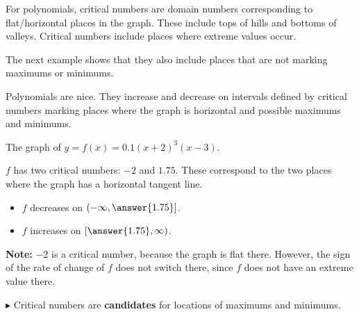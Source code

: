 \documentclass{ximera}
\begin{document}
For polynomials, critical numbers are domain numbers corresponding to flat/horizontal places in the graph.  These include tops of hills and bottoms of valleys. Critical numbers include places where extreme values occur.


The next example shows that they also include places that are not marking maximums or minimums.


















Polynomials are nice.  They increase and decrease on intervals defined by critical numbers marking places where the graph is horizontal and possible maximums and minimums.









\begin{example}

The graph of $y = f(x) = 0.1(x+2)^3(x-3)$.



\begin{center}
\end{center}



$f$ has two critical numbers: $-2$ and $1.75$. These correspond to the two places where the graph has a horizontal tangent line.

\begin{itemize}
\item $f$ decreases on $\left(-\infty, \answer{1.75}\right]$.
\item $f$ increases on $\left[\answer{1.75}, \infty\right)$.
\end{itemize}




\end{example}


\textbf{Note:} $-2$ is a critical number, because the graph is flat there.  However, the sign of the rate of change of $f$ does not switch there, since $f$ does not have an extreme value there.

\textbf{\textcolor{red!70!black}{$\blacktriangleright$}} Critical numbers are \textbf{candidates} for locations of maximums and minimums.
\end{document}
